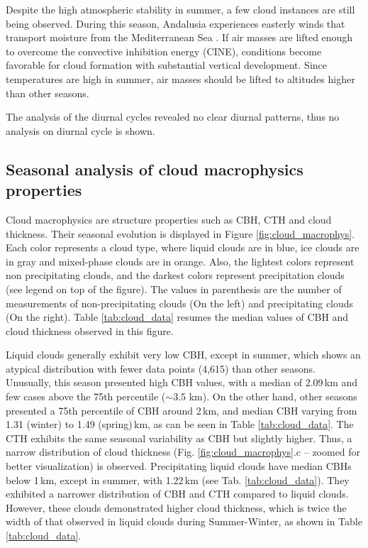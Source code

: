 Despite the high atmospheric stability in summer, a few cloud instances are still being observed. During this season, Andalusia experiences easterly winds that transport moisture from the Mediterranean Sea \citep{bello-millanSimulationsTornadicSupercell2024}. If air masses are lifted enough to overcome the convective inhibition energy (CINE), conditions become favorable for cloud formation with substantial vertical development. Since temperatures are high in summer, air masses should be lifted to altitudes higher than other seasons. 

The analysis of the diurnal cycles revealed no clear diurnal patterns, thus no analysis on diurnal cycle is shown.

\subsection{Seasonal analysis of cloud macrophysics properties}

Cloud macrophysics are structure properties such as CBH, CTH and cloud thickness. Their seasonal evolution is displayed in Figure \ref{fig:cloud_macrophys}. Each color represents a cloud type, where liquid clouds are in blue, ice clouds are in gray and mixed-phase clouds are in orange. Also, the lightest colors represent non precipitating clouds, and the darkest colors represent precipitation clouds (see legend on top of the figure). The values in parenthesis are the number of measurements of non-precipitating clouds (On the left) and precipitating clouds (On the right). Table \ref{tab:cloud_data} resumes the median values of CBH and cloud thickness observed in this figure.

Liquid clouds generally exhibit very low CBH, except in summer, which shows an atypical distribution with fewer data points (4,615) than other seasons. Unusually, this season presented high CBH values, with a median of 2.09\,km and few cases above the 75th percentile ($\sim$3.5 km). On the other hand, other seasons presented a 75th percentile of CBH around 2\,km, and median CBH varying from 1.31 (winter) to 1.49 (spring)\,km, as can be seen in Table \ref{tab:cloud_data}. The CTH exhibits the same seasonal variability as CBH but slightly higher. Thus, a narrow distribution of cloud thickness (Fig. \ref{fig:cloud_macrophys}.c – zoomed for better visualization) is observed. Precipitating liquid clouds have median CBHs below 1\,km, except in summer, with 1.22\,km (see Tab. \ref{tab:cloud_data}). They exhibited a narrower distribution of CBH and CTH compared to liquid clouds. However, these clouds demonstrated higher cloud thickness, which is twice the width of that observed in liquid clouds during Summer-Winter, as shown in Table \ref{tab:cloud_data}. 

